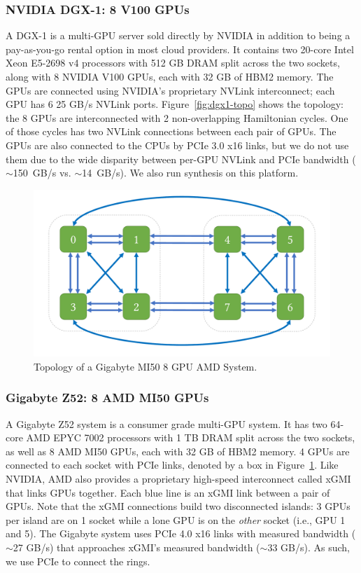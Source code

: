 \subsubsection{NVIDIA DGX-1: 8 V100 GPUs}
A DGX-1 is a multi-GPU server sold directly by NVIDIA in addition to
being a pay-as-you-go rental option in most cloud providers.  It
contains two 20-core Intel Xeon E5-2698 v4 processors with 512 GB DRAM
split across the two sockets, along with 8 NVIDIA V100 GPUs, each
with 32 GB of HBM2 memory. The GPUs are connected using NVIDIA's proprietary NVLink
interconnect; each GPU has 6 25 GB/s NVLink ports.  Figure~\ref{fig:dgx1-topo} shows the
topology: the 8 GPUs are interconnected with 2 non-overlapping
Hamiltonian cycles.  One of those cycles has two
NVLink connections between each pair of GPUs. The GPUs are also connected to the CPUs by PCIe 3.0 x16 links, but we do not use them
due to the wide disparity between per-GPU NVLink and PCIe bandwidth ($\sim$150~GB/s vs. $\sim$14~GB/s).
We also run synthesis on this platform.

\begin{figure}
\includegraphics[page=2,width=\columnwidth]{figures/topos}
\caption{Topology of a Gigabyte MI50 8 GPU AMD System.}
\label{fig:amd-topo}
\end{figure}

\subsubsection{Gigabyte Z52: 8 AMD MI50 GPUs}
A Gigabyte Z52 system is a consumer grade multi-GPU system.
It has two 64-core AMD EPYC 7002 processors with 1 TB DRAM split across the two sockets, as well as 
8 AMD MI50 GPUs, each with 32 GB of HBM2 memory. 4 GPUs are connected to each socket with PCIe links, denoted by a box in Figure~\ref{fig:amd-topo}.
Like NVIDIA, AMD also provides a proprietary high-speed
interconnect called xGMI that links GPUs together.  Each blue line is
an xGMI link between a pair of GPUs.  Note that the xGMI connections
build two disconnected islands: 3 GPUs per island are on 1 socket
while a lone GPU is on the \emph{other} socket (i.e., GPU 1 and 5).
The Gigabyte system uses PCIe 4.0 x16 links with measured bandwidth ($\sim$27 GB/s)
that approaches xGMI's measured bandwidth ($\sim$33 GB/s). As such, we use PCIe to
connect the rings.

